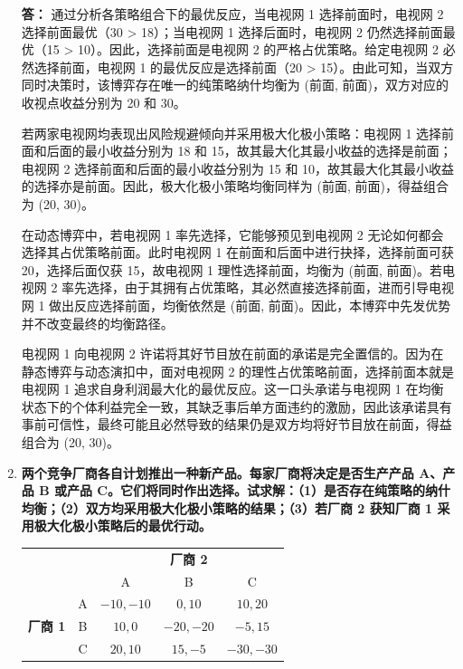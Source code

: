 \begin{enumerate}[label=\textbf{\arabic*.}, leftmargin=*]
		\textbf{答：}
		通过分析各策略组合下的最优反应，当电视网 1 选择前面时，电视网 2 选择前面最优（30 > 18）；当电视网 1 选择后面时，电视网 2 仍然选择前面最优（15 > 10）。因此，选择前面是电视网 2 的严格占优策略。给定电视网 2 必然选择前面，电视网 1 的最优反应是选择前面（20 > 15）。由此可知，当双方同时决策时，该博弈存在唯一的纯策略纳什均衡为 (前面, 前面)，双方对应的收视点收益分别为 20 和 30。
		
		若两家电视网均表现出风险规避倾向并采用极大化极小策略：电视网 1 选择前面和后面的最小收益分别为 18 和 15，故其最大化其最小收益的选择是前面；电视网 2 选择前面和后面的最小收益分别为 15 和 10，故其最大化其最小收益的选择亦是前面。因此，极大化极小策略均衡同样为 (前面, 前面)，得益组合为 (20, 30)。
		
		在动态博弈中，若电视网 1 率先选择，它能够预见到电视网 2 无论如何都会选择其占优策略前面。此时电视网 1 在前面和后面中进行抉择，选择前面可获 20，选择后面仅获 15，故电视网 1 理性选择前面，均衡为 (前面, 前面)。若电视网 2 率先选择，由于其拥有占优策略，其必然直接选择前面，进而引导电视网 1 做出反应选择前面，均衡依然是 (前面, 前面)。因此，本博弈中先发优势并不改变最终的均衡路径。
		
		电视网 1 向电视网 2 许诺将其好节目放在前面的承诺是完全置信的。因为在静态博弈与动态演扣中，面对电视网 2 的理性占优策略前面，选择前面本就是电视网 1 追求自身利润最大化的最优反应。这一口头承诺与电视网 1 在均衡状态下的个体利益完全一致，其缺乏事后单方面违约的激励，因此该承诺具有事前可信性，最终可能且必然导致的结果仍是双方均将好节目放在前面，得益组合为 (20, 30)。
		\newpage
		\item \textbf{两个竞争厂商各自计划推出一种新产品。每家厂商将决定是否生产产品 A、产品 B 或产品 C。它们将同时作出选择。试求解：（1）是否存在纯策略的纳什均衡；（2）双方均采用极大化极小策略的结果；（3）若厂商 2 获知厂商 1 采用极大化极小策略后的最优行动。}
		
		\begin{center}
			\small
			\renewcommand{\arraystretch}{1.3}
			\setlength{\tabcolsep}{4pt}
			\begin{tabular}{cc|c|c|c|}
				\multicolumn{2}{c}{} & \multicolumn{3}{c}{\textbf{厂商 2}} \\
				\multicolumn{2}{c}{} & \multicolumn{1}{c}{A} & \multicolumn{1}{c}{B} & \multicolumn{1}{c}{C} \\
				\cline{3-5}
				& A & $-10, -10$ & $0, 10$ & $10, 20$ \\
				\cline{3-5}
				\textbf{厂商 1} & B & $10, 0$ & $-20, -20$ & $-5, 15$ \\
				\cline{3-5}
				& C & $20, 10$ & $15, -5$ & $-30, -30$ \\
				\cline{3-5}
			\end{tabular}
		\end{center}
		

\end{enumerate}
